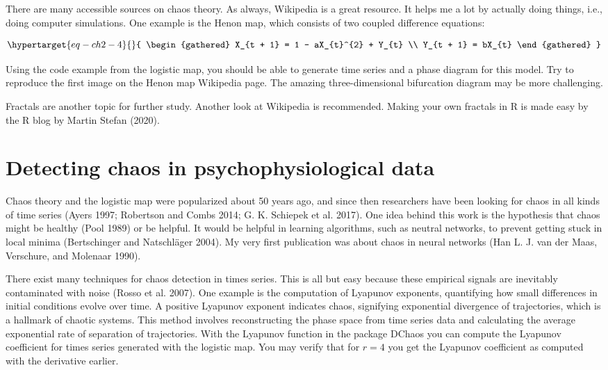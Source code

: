 \documentclass[
  a4paper,
  DIV=11,
  numbers=noendperiod,
  oneside]{scrreprt}
\begin{document}
There are many accessible sources on chaos theory. As always, Wikipedia
is a great resource. It helps me a lot by actually doing things, i.e.,
doing computer simulations. One example is the Henon map, which consists
of two coupled difference equations:

\begin{equation}\protect\hypertarget{eq-ch2-4}{}{
\begin{gathered}
X_{t + 1} = 1 - aX_{t}^{2} + Y_{t} \\
Y_{t + 1} = bX_{t} 
\end{gathered}
}\label{eq-ch2-4}\end{equation}

Using the code example from the logistic map, you should be able to
generate time series and a phase diagram for this model. Try to
reproduce the first image on the Henon map Wikipedia page. The amazing
three-dimensional bifurcation diagram may be more challenging.

Fractals are another topic for further study. Another look at Wikipedia
is recommended. Making your own fractals in R is made easy by the R blog
by Martin Stefan (2020).

\hypertarget{sec-Detecting-chaos-in-psychophysiological-data}{%
\section{Detecting chaos in psychophysiological
data}\label{sec-Detecting-chaos-in-psychophysiological-data}}

Chaos theory and the logistic map were popularized about 50 years ago,
and since then researchers have been looking for chaos in all kinds of
time series (Ayers 1997; Robertson and Combs 2014; G. K. Schiepek et al.
2017). One idea behind this work is the hypothesis that chaos might be
healthy (Pool 1989) or be helpful. It would be helpful in learning
algorithms, such as neutral networks, to prevent getting stuck in local
minima (Bertschinger and Natschläger 2004). My very first publication
was about chaos in neural networks (Han L. J. van der Maas, Verschure,
and Molenaar 1990).

There exist many techniques for chaos detection in times series. This is
all but easy because these empirical signals are inevitably contaminated
with noise (Rosso et al. 2007). One example is the computation of
Lyapunov exponents, quantifying how small differences in initial
conditions evolve over time. A positive Lyapunov exponent indicates
chaos, signifying exponential divergence of trajectories, which is a
hallmark of chaotic systems. This method involves reconstructing the
phase space from time series data and calculating the average
exponential rate of separation of trajectories. With the Lyapunov
function in the package DChaos you can compute the Lyapunov coefficient
for times series generated with the logistic map. You may verify that
for \(r = 4\) you get the Lyapunov coefficient as computed with the
derivative earlier.
\end{document}
